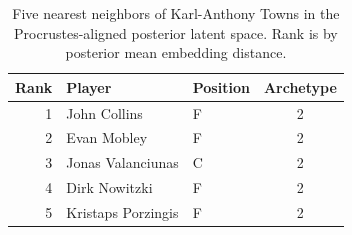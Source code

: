 \begin{table}[htbp]
  \centering\small
  \begin{tabular}{rllc}
    \toprule
    Rank & Player & Position & Archetype \\
    \midrule
    1 & John Collins & F & 2 \\
    2 & Evan Mobley & F & 2 \\
    3 & Jonas Valanciunas & C & 2 \\
    4 & Dirk Nowitzki & F & 2 \\
    5 & Kristaps Porzingis & F & 2 \\
    \bottomrule
  \end{tabular}
  \caption{Five nearest neighbors of Karl-Anthony Towns in the Procrustes-aligned posterior latent space. Rank is by posterior mean embedding distance.}
  \label{tab:Karl_Anthony_Towns_neighbors}
\end{table}

